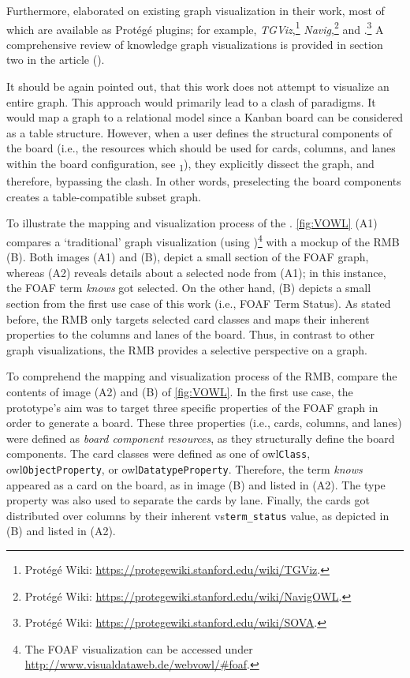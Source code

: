 Furthermore, \citeauthor{Lohmann2016} elaborated on existing graph visualization in their work, most of which are available as Protégé plugins; for example, \textit{TGViz},\footnote{Protégé Wiki: \url{https://protegewiki.stanford.edu/wiki/TGViz}.} \textit{Navig},\footnote{Protégé Wiki: \url{https://protegewiki.stanford.edu/wiki/NavigOWL}.} and \textit{}.\footnote{Protégé Wiki: \url{https://protegewiki.stanford.edu/wiki/SOVA}.} A comprehensive review of knowledge graph visualizations is provided in section two in the article (\cite[2]{Lohmann2016}). 

It should be again pointed out, that this work does not attempt to visualize an entire graph. This approach would primarily lead to a clash of paradigms. It would map a graph to a relational model since a Kanban board can be considered as a table structure. However, when a user defines the structural components of the board (i.e., the resources which should be used for cards, columns, and lanes within the board configuration, see \textsubscript{1}), they explicitly dissect the graph, and therefore, bypassing the clash. In other words, preselecting the board components creates a table-compatible subset graph.

\newpage

\noindent To illustrate the mapping and visualization process of the . \autoref{fig:VOWL} (A1) compares a `traditional' graph visualization (using )\footnote{The  \acrshort*{FOAF} visualization can be accessed under \url{http://www.visualdataweb.de/webvowl/\#foaf}.} with a mockup of the \acrlong*{RMB} (B). Both images (A1) and (B), depict a small section of the \acrshort*{FOAF} graph, whereas (A2) reveals details about a selected node from (A1); in this instance, the \acrshort*{FOAF} term \textit{knows} got selected. On the other hand, (B) depicts a small section from the first use case of this work (i.e., \acrshort*{FOAF} Term Status). As stated before, the \acrshort*{RMB} only targets selected card classes and maps their inherent properties to the columns and lanes of the board. Thus, in contrast to other graph visualizations, the \acrshort*{RMB} provides a selective perspective on a graph. 

To comprehend the mapping and visualization process of the \acrshort*{RMB}, compare the contents of image (A2) and (B) of \autoref{fig:VOWL}. In the first use case, the prototype’s aim was to target three specific properties of the \acrshort*{FOAF} graph in order to generate a board. These three properties (i.e., cards, columns, and lanes) were defined as \textit{board component resources}, as they structurally define the board components. The card classes were defined as one of \acrshort{owl}\texttt{Class}, \acrshort{owl}\texttt{ObjectProperty}, or \acrshort{owl}\texttt{DatatypeProperty}. Therefore, the term \textit{knows} appeared as a card on the board, as in image (B) and listed in (A2). The type property was also used to separate the cards by lane. Finally, the cards got distributed over columns by their inherent \acrshort{vs}\texttt{term\_status} value, as depicted in (B) and listed in (A2).


